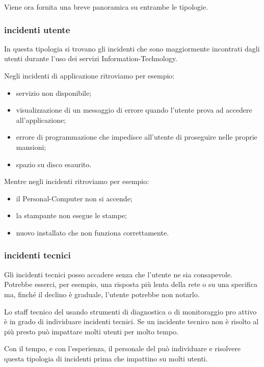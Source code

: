 Viene ora fornita una breve panoramica su entrambe le tipologie.

\subsubsection[Incidenti utente]{incidenti utente}
In questa tipologia si trovano gli incidenti che sono maggiormente incontrati dagli utenti durante l'uso dei servizi \acs{Information-Technology}.

Negli incidenti di applicazione ritroviamo per esempio:

\begin{itemize}
\item{servizio non disponibile;}
\item{visualizzazione di un messaggio di errore quando l'utente prova ad accedere all'applicazione;}
\item{errore di programmazione che impedisce all'utente di proseguire nelle proprie mansioni;}
\item{spazio su disco esaurito.}
\end{itemize}

Mentre negli incidenti  ritroviamo per esempio:

\begin{itemize}
\item{il \acs{Personal-Computer} non si accende;}
\item{la stampante non esegue le stampe;}
\item{nuovo  installato che non funziona correttamente.}
\end{itemize}

\subsubsection[Incidenti tecnici]{incidenti tecnici}
Gli incidenti tecnici posso accadere senza che l'utente ne sia consapevole. Potrebbe esserci, per esempio, una risposta più lenta della rete o su una specifica  ma, finché il declino è graduale, l'utente potrebbe non notarlo.

Lo staff tecnico del  usando strumenti di diagnostica o di monitoraggio pro attivo è in grado di individuare incidenti tecnici. Se un incidente tecnico non è risolto al più presto può impattare molti utenti per molto tempo.

Con il tempo, e con l'esperienza, il personale del  può individuare e risolvere questa tipologia di incidenti prima che impattino su molti utenti.

